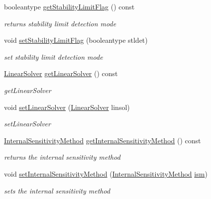 \begin{DoxyCompactItemize}
booleantype \mbox{\hyperlink{classamici_1_1_solver_ae1e9c3c5e59413ae25fb67c29983e3f3}{get\+Stability\+Limit\+Flag}} () const
\begin{DoxyCompactList}\small\item\em returns stability limit detection mode \end{DoxyCompactList}\item 
void \mbox{\hyperlink{classamici_1_1_solver_a618a94f1d84f9c71230d476f9a0205ce}{set\+Stability\+Limit\+Flag}} (booleantype stldet)
\begin{DoxyCompactList}\small\item\em set stability limit detection mode \end{DoxyCompactList}\item 
\mbox{\hyperlink{namespaceamici_a1a6a4776314a0843143e5631c3ce21a7}{Linear\+Solver}} \mbox{\hyperlink{classamici_1_1_solver_aa5cde2d316aae1d60d6eaf94ce7a854f}{get\+Linear\+Solver}} () const
\begin{DoxyCompactList}\small\item\em get\+Linear\+Solver \end{DoxyCompactList}\item 
void \mbox{\hyperlink{classamici_1_1_solver_acc8ecf11ad5a8480dd02f757faa264b2}{set\+Linear\+Solver}} (\mbox{\hyperlink{namespaceamici_a1a6a4776314a0843143e5631c3ce21a7}{Linear\+Solver}} linsol)
\begin{DoxyCompactList}\small\item\em set\+Linear\+Solver \end{DoxyCompactList}\item 
\mbox{\hyperlink{namespaceamici_aa444c52f0a5638d68702d1ec92f8db87}{Internal\+Sensitivity\+Method}} \mbox{\hyperlink{classamici_1_1_solver_a256c45c84346e83402b665493e04e65e}{get\+Internal\+Sensitivity\+Method}} () const
\begin{DoxyCompactList}\small\item\em returns the internal sensitivity method \end{DoxyCompactList}\item 
void \mbox{\hyperlink{classamici_1_1_solver_ab114a079f23232a521ad2e81a0a30e36}{set\+Internal\+Sensitivity\+Method}} (\mbox{\hyperlink{namespaceamici_aa444c52f0a5638d68702d1ec92f8db87}{Internal\+Sensitivity\+Method}} \mbox{\hyperlink{classamici_1_1_solver_a5b3b5ca18d3932765358bdf278290861}{ism}})
\begin{DoxyCompactList}\small\item\em sets the internal sensitivity method \end{DoxyCompactList}\end{DoxyCompactItemize}
